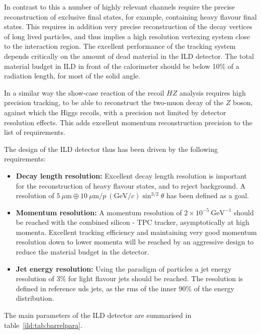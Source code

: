 \documentclass[%
 amsmath,amssymb,
 aps,
]{revtex4-1}
\begin{document}
In contrast to this a number of highly relevant channels require the precise reconstruction of exclusive final states, for example, containing heavy flavour final states. This requires in addition very precise reconstruction of the decay vertices of long lived particles, and thus implies a high resolution vertexing system close to the interaction region. 
The excellent performance of the tracking system depends critically on the amount of dead material in the ILD detector. The total material budget in ILD in front of the calorimeter should be below 10\% of a radiation length, for most of the solid angle.


In a similar way the show-case reaction of the recoil $HZ$ analysis requires high precision tracking, to be able to reconstruct the two-muon decay of the $Z$ boson, against which the Higgs recoils, with a precision not limited by detector resolution effects. This adds excellent momentum reconstruction precision to the list of requirements. 

The design of the ILD detector thus has been driven by the following requirements: 
\begin{itemize}
    \item {\bf Decay length resolution:} Excellent decay length resolution is important for the reconstruction of heavy flavour states, and to reject background. A resolution of $ 5~\mu \mathrm{m} \oplus 10~\mu \mathrm{m} / p~({\mathrm{GeV}/c})\sin^{3/2}\theta$ has been defined as a goal. 
    \item {\bf Momentum resolution:} A momentum resolution of $2 \times 10^{-5}~\mathrm{GeV}^{-1}$ should be reached with the combined silicon - TPC tracker, asymptotically at high momenta. Excellent tracking efficiency and maintaining very good momentum resolution down to lower momenta will be reached by an aggressive design to reduce the material budget in the detector. 
    \item {\bf Jet energy resolution:} Using the paradigm of particles a jet energy resolution of $3\%$ for light flavour jets should be reached. The resolution is defined in reference uds jets, as the rms of the inner $90\%$ of the energy distribution. 
\end{itemize}


The main parameters of the ILD detector are summarised in table~\ref{ild:tab:barrelpara}.
\end{document}
